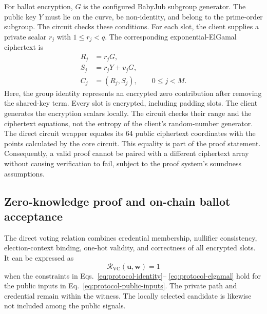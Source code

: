 For ballot encryption, $G$ is the configured BabyJub subgroup generator.
The public key $Y$ must lie on the curve, be non-identity, and belong to
the prime-order subgroup. The circuit checks these conditions. For each
slot, the client supplies a private scalar $r_j$ with $1\leq r_j<q$.
The corresponding exponential-ElGamal ciphertext is
\begin{equation}
\label{eq:protocol-elgamal}
\begin{aligned}
 R_j &= r_jG,\\
 S_j &= r_jY+v_jG,\\
 C_j &= (R_j,S_j),\qquad 0\leq j<M.
\end{aligned}
\end{equation}
Here, the group identity represents an encrypted zero contribution after
removing the shared-key term. Every slot is encrypted, including padding
slots. The client generates the encryption scalars locally. The circuit
checks their range and the ciphertext equations, not the entropy of the
client's random-number generator.
The direct circuit wrapper equates its 64 public ciphertext coordinates
with the points calculated by the core circuit. This equality is part of
the proof statement. Consequently, a valid proof cannot be paired with a
different ciphertext array without causing verification to fail, subject
to the proof system's soundness assumptions.


\subsection{Zero-knowledge proof and on-chain ballot acceptance}
\label{subsec:protocol-verification}

The direct voting relation combines credential membership, nullifier
consistency, election-context binding, one-hot validity, and correctness of
all encrypted slots. It can be expressed as
\begin{equation}
\label{eq:protocol-relation}
\mathcal{R}_{\mathrm{VC}}(\mathbf{u},\mathbf{w})=1
\end{equation}
when the constraints in Eqs.~\eqref{eq:protocol-identity}--
\eqref{eq:protocol-elgamal} hold for the public inputs in
Eq.~\eqref{eq:protocol-public-inputs}. The private path and credential
remain within the witness. The locally selected candidate is likewise
not included among the public signals.

